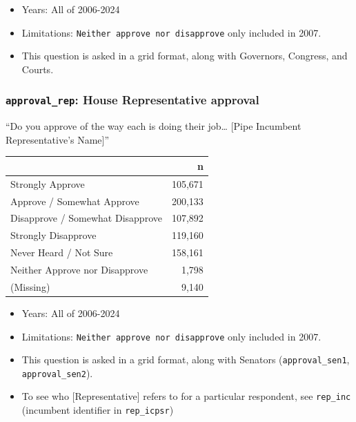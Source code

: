 \documentclass[10pt,article,oneside]{memoir}
\begin{document}
\begin{itemize}
\tightlist
\item
  Years: All of 2006-2024
\item
  Limitations: \texttt{Neither\ approve\ nor\ disapprove} only included
  in 2007.
\item
  This question is asked in a grid format, along with Governors,
  Congress, and Courts.
\end{itemize}

\subsubsection{\texorpdfstring{\texttt{approval\_rep}: House
Representative
approval}{approval\_rep: House Representative approval}}\label{approval_rep-house-representative-approval}

``Do you approve of the way each is doing their job\ldots{} {[}Pipe
Incumbent Representative's Name{]}''

\begin{table}[H]
\centering
\begin{tabular}[t]{lr}
\toprule
 & n\\
\midrule
Strongly Approve & 105,671\\
Approve / Somewhat Approve & 200,133\\
Disapprove / Somewhat Disapprove & 107,892\\
Strongly Disapprove & 119,160\\
Never Heard / Not Sure & 158,161\\
Neither Approve nor Disapprove & 1,798\\
(Missing) & 9,140\\
\bottomrule
\end{tabular}
\end{table}

\begin{itemize}
\tightlist
\item
  Years: All of 2006-2024
\item
  Limitations: \texttt{Neither\ approve\ nor\ disapprove} only included
  in 2007.
\item
  This question is asked in a grid format, along with Senators
  (\texttt{approval\_sen1}, \texttt{approval\_sen2}).
\item
  To see who {[}Representative{]} refers to for a particular respondent,
  see \texttt{rep\_inc} (incumbent identifier in \texttt{rep\_icpsr})
\end{itemize}
\end{document}
